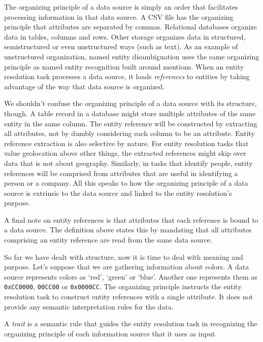 The organizing principle of a data source is simply an order that
facilitates processing information in that data source.
A CSV file has the organizing principle that attributes are separated by
commas.
Relational databases organize data in tables, columns and rows.
Other storage organizes data in structured, semistructured or even
unstructured ways (such as text).
As an example of unstructured organization, named entity disambiguation uses
the same organizing principle as named entity recognition built around
mentions.
When an entity resolution task processes a data source, it loads
\textit{references}\cite{Ben2009Swoosh} to entities by taking advantage of
the way that data source is organized.

We shouldn't confuse the organizing principle of a data source with its
structure, though.
A table record in a database might store multiple attributes of the same
entity in the same column.
The entity reference will be constructed by extracting all attributes, not
by dumbly considering each column to be an attribute.
Entity reference extraction is also selective by nature.
For entity resolution tasks that value geolocation above other things, the
extracted references might skip over data that is not about geography.
Similarly, in tasks that identify people, entity references will be
comprised from attributes that are useful in identifying a person or a
company.
All this speaks to how the organizing principle of a data source is
extrinsic to the data source and linked to the entity resolution's purpose.

A final note on entity references is that attributes that each reference is
bound to a data source.
The definition above states this by mandating that all attributes comprising
an entity reference are read from the same data source.

So far we have dealt with structure, now it is time to deal with meaning and
purpose.    
Let's suppose that we are gathering information about colors.
A data source represents colors as `red', `green' or `blue'.
Another one represents them as \texttt{0xCC0000}, \texttt{00CC00} or
\texttt{0x0000CC}.
The organizing principle instructs the entity resolution task to construct
entity references with a single attribute.
It does not provide any semantic interpretation rules for the data.

\begin{defn}
    A \textit{trait} is a semantic rule that guides the entity resolution
    task in recognizing the organizing principle of each information source
    that it uses as input.
\end{defn}

